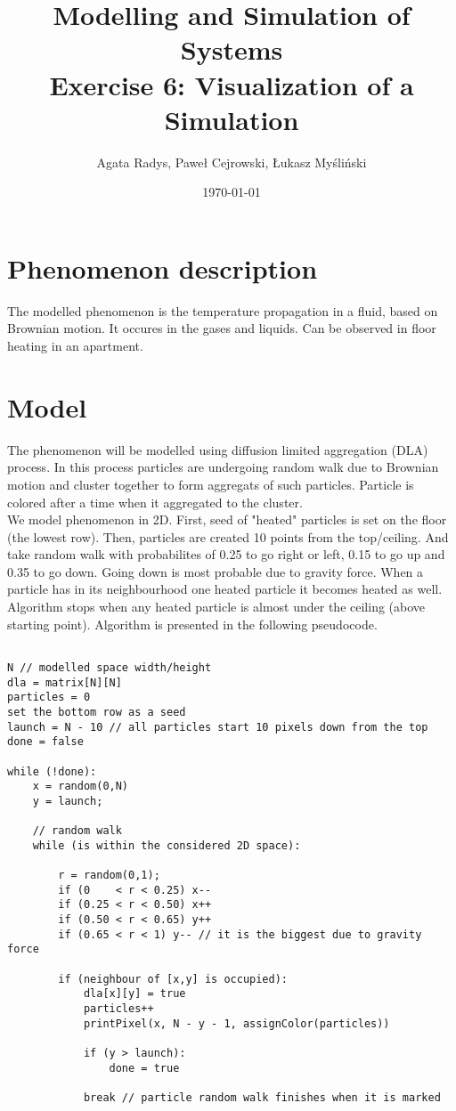 \documentclass[a4paper,10pt]{article}
\title{Modelling and Simulation of Systems\\ \Large
Exercise 6: Visualization of a Simulation}
\author{Agata Radys, Paweł Cejrowski, Łukasz Myśliński}
\date{\today}
\begin{document}
\maketitle

\section*{Phenomenon description}
The modelled phenomenon is the temperature propagation in a fluid, based on Brownian motion. It occures in the gases and
liquids. Can be observed in floor heating in an apartment.
\section*{Model}
The phenomenon will be modelled using diffusion limited aggregation (DLA) process. In this process particles are undergoing
random walk due to Brownian motion and cluster together to form aggregats of such particles. Particle is colored after a time
when it aggregated to the cluster.
\\
We model phenomenon in 2D. First, seed of "heated" particles is set on the floor (the lowest row). Then, particles are created
10 points from the top/ceiling. And take random walk with probabilites of 0.25 to go right or left, 0.15 to go up and 0.35 to go down.
Going down is most probable due to gravity force. When a particle has in its neighbourhood one heated particle it becomes heated as well.
Algorithm stops when any heated particle is almost under the ceiling (above starting point). Algorithm is presented in the following pseudocode.

\begin{lstlisting}[]

N // modelled space width/height
dla = matrix[N][N]
particles = 0
set the bottom row as a seed
launch = N - 10 // all particles start 10 pixels down from the top
done = false

while (!done):
    x = random(0,N)
    y = launch;

    // random walk
    while (is within the considered 2D space):

        r = random(0,1);
        if (0    < r < 0.25) x--
        if (0.25 < r < 0.50) x++
        if (0.50 < r < 0.65) y++
        if (0.65 < r < 1) y-- // it is the biggest due to gravity force

        if (neighbour of [x,y] is occupied):
            dla[x][y] = true
            particles++
            printPixel(x, N - y - 1, assignColor(particles))

            if (y > launch):
                done = true

            break // particle random walk finishes when it is marked
\end{lstlisting}
\end{document}
